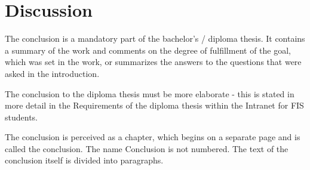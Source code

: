 \chapter*{Discussion}

The conclusion is a mandatory part of the bachelor's / diploma thesis. It contains a summary of the work and comments on the degree of fulfillment of the goal, which was set in the work, or summarizes the answers to the questions that were asked in the introduction.

The conclusion to the diploma thesis must be more elaborate - this is stated in more detail in the Requirements of the diploma thesis within the Intranet for FIS students.

The conclusion is perceived as a chapter, which begins on a separate page and is called the conclusion. The name Conclusion is not numbered. The text of the conclusion itself is divided into paragraphs.
